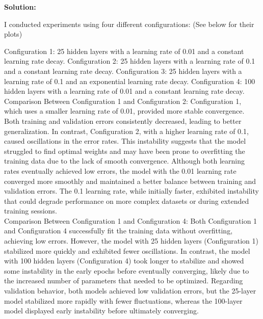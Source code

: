 \documentclass{article}
\newenvironment{solution}{\color{blue} \smallskip \textbf{Solution:}}{}
\begin{document}
\begin{solution}

I conducted experiments using four different configurations: (See below for their plots)

Configuration 1: 25 hidden layers with a learning rate of 0.01 and a constant learning rate decay.
Configuration 2: 25 hidden layers with a learning rate of 0.1 and a constant learning rate decay.
Configuration 3: 25 hidden layers with a learning rate of 0.1 and an exponential learning rate decay.
Configuration 4: 100 hidden layers with a learning rate of 0.01 and a constant learning rate decay.\\

Comparison Between Configuration 1 and Configuration 2:
Configuration 1, which uses a smaller learning rate of 0.01, provided more stable convergence. Both training and validation errors consistently decreased, leading to better generalization. In contrast, Configuration 2, with a higher learning rate of 0.1, caused oscillations in the error rates. This instability suggests that the model struggled to find optimal weights and may have been prone to overfitting the training data due to the lack of smooth convergence. Although both learning rates eventually achieved low errors, the model with the 0.01 learning rate converged more smoothly and maintained a better balance between training and validation errors. The 0.1 learning rate, while initially faster, exhibited instability that could degrade performance on more complex datasets or during extended training sessions.\\

Comparison Between Configuration 1 and Configuration 4:
Both Configuration 1 and Configuration 4 successfully fit the training data without overfitting, achieving low errors. However, the model with 25 hidden layers (Configuration 1) stabilized more quickly and exhibited fewer oscillations. In contrast, the model with 100 hidden layers (Configuration 4) took longer to stabilize and showed some instability in the early epochs before eventually converging, likely due to the increased number of parameters that needed to be optimized. Regarding validation behavior, both models achieved low validation errors, but the 25-layer model stabilized more rapidly with fewer fluctuations, whereas the 100-layer model displayed early instability before ultimately converging.\\


\end{solution}
\end{document}
